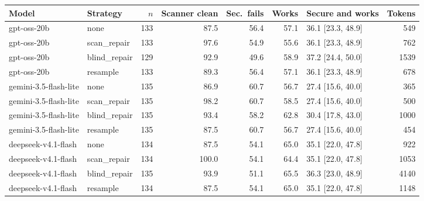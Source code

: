 \begin{tabular}{llrrrrlr}
\toprule
Model & Strategy & $n$ & Scanner clean & Sec.\ fails & Works & Secure and works & Tokens \\
\midrule
gpt-oss-20b & none & 133 & 87.5 & 56.4 & 57.1 & 36.1 [23.3, 48.9] & 549 \\
gpt-oss-20b & scan\_repair & 133 & 97.6 & 54.9 & 55.6 & 36.1 [23.3, 48.9] & 762 \\
gpt-oss-20b & blind\_repair & 129 & 92.9 & 49.6 & 58.9 & 37.2 [24.4, 50.0] & 1539 \\
gpt-oss-20b & resample & 133 & 89.3 & 56.4 & 57.1 & 36.1 [23.3, 48.9] & 678 \\
gemini-3.5-flash-lite & none & 135 & 86.9 & 60.7 & 56.7 & 27.4 [15.6, 40.0] & 365 \\
gemini-3.5-flash-lite & scan\_repair & 135 & 98.2 & 60.7 & 58.5 & 27.4 [15.6, 40.0] & 500 \\
gemini-3.5-flash-lite & blind\_repair & 135 & 93.4 & 58.2 & 62.8 & 30.4 [17.8, 43.0] & 1000 \\
gemini-3.5-flash-lite & resample & 135 & 87.5 & 60.7 & 56.7 & 27.4 [15.6, 40.0] & 454 \\
deepseek-v4.1-flash & none & 134 & 87.5 & 54.1 & 65.0 & 35.1 [22.0, 47.8] & 922 \\
deepseek-v4.1-flash & scan\_repair & 134 & 100.0 & 54.1 & 64.4 & 35.1 [22.0, 47.8] & 1053 \\
deepseek-v4.1-flash & blind\_repair & 135 & 93.9 & 51.1 & 65.5 & 36.3 [23.0, 48.9] & 4140 \\
deepseek-v4.1-flash & resample & 134 & 87.5 & 54.1 & 65.0 & 35.1 [22.0, 47.8] & 1148 \\
\bottomrule
\end{tabular}
